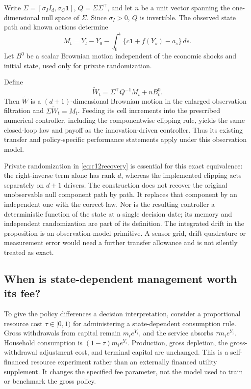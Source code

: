 Write $\Sigma=[\sigma_I I_d,\sigma_C\bm1]$, $Q=\Sigma\Sigma^\top$, and let $n$ be a unit vector spanning the one-dimensional null space of $\Sigma$. Since $\sigma_I>0$, $Q$ is invertible. The observed state path and known actions determine
\[
 M_t=Y_t-Y_0-\int_0^t\{c\bm1+f(Y_s)-a_s\}\,ds.
\]
Let $B^0$ be a scalar Brownian motion independent of the economic shocks and initial state, used only for private randomization.

\begin{proposition}\label{prop:r12observation}
Define
\begin{equation}\label{eq:r12recovery}
 \widetilde W_t=\Sigma^\top Q^{-1}M_t+nB^0_t.
\end{equation}
Then $\widetilde W$ is a $(d+1)$-dimensional Brownian motion in the enlarged observation filtration and $\Sigma\widetilde W_t=M_t$. Feeding its cell increments into the prescribed numerical controller, including the componentwise clipping rule, yields the same closed-loop law and payoff as the innovation-driven controller. Thus its existing transfer and policy-specific performance statements apply under this observation model.
\end{proposition}

Private randomization in \eqref{eq:r12recovery} is essential for this exact equivalence: the right-inverse term alone has rank $d$, whereas the implemented clipping acts separately on $d+1$ drivers. The construction does not recover the original unobservable null component path by path. It replaces that component by an independent one with the correct law. Nor is the resulting controller a deterministic function of the state at a single decision date; its memory and independent randomization are part of its definition. The integrated drift in the proposition is an observation-model primitive. A sensor grid, drift quadrature or measurement error would need a further transfer allowance and is not silently treated as exact.




\subsection{When is state-dependent management worth its fee?}\label{sec:r12fees}
To give the policy differences a decision interpretation, consider a proportional resource cost $\tau\in[0,1)$ for administering a state-dependent consumption rule. Gross withdrawals from capital remain $m_i e^{Y_i}$, and the service absorbs $\tau m_i e^{Y_i}$. Household consumption is $(1-\tau)m_i e^{Y_i}$. Production, gross depletion, the gross-withdrawal adjustment cost, and terminal capital are unchanged. This is a self-financed resource experiment rather than an externally financed utility supplement. It changes the specified fee parameter, not the model used to train or benchmark the gross policy.


